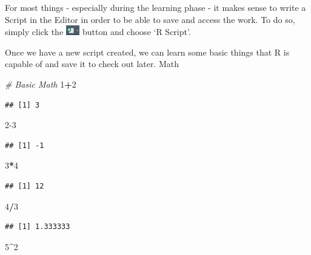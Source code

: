 \documentclass[
]{book}
\newenvironment{Shaded}{\begin{snugshade}}{\end{snugshade}}
\newcommand{\CommentTok}[1]{\textcolor[rgb]{0.56,0.35,0.01}{\textit{#1}}}
\newcommand{\DecValTok}[1]{\textcolor[rgb]{0.00,0.00,0.81}{#1}}
\newcommand{\SpecialCharTok}[1]{\textcolor[rgb]{0.81,0.36,0.00}{\textbf{#1}}}
\begin{document}
For most things - especially during the learning phase - it makes sense to write a Script in the Editor in order to be able to save and access the work.
To do so, simply click the \includegraphics[width=\textwidth,height=0.16667in]{./img/newfile.png} button and choose `R Script'.

Once we have a new script created, we can learn some basic things that R is capable of and save it to check out later.
Math

\begin{Shaded}
\begin{Highlighting}[]
\CommentTok{\# Basic Math}
\DecValTok{1}\SpecialCharTok{+}\DecValTok{2} 
\end{Highlighting}
\end{Shaded}

\begin{verbatim}
## [1] 3
\end{verbatim}

\begin{Shaded}
\begin{Highlighting}[]
\DecValTok{2{-}3}
\end{Highlighting}
\end{Shaded}

\begin{verbatim}
## [1] -1
\end{verbatim}

\begin{Shaded}
\begin{Highlighting}[]
\DecValTok{3}\SpecialCharTok{*}\DecValTok{4}
\end{Highlighting}
\end{Shaded}

\begin{verbatim}
## [1] 12
\end{verbatim}

\begin{Shaded}
\begin{Highlighting}[]
\DecValTok{4}\SpecialCharTok{/}\DecValTok{3}
\end{Highlighting}
\end{Shaded}

\begin{verbatim}
## [1] 1.333333
\end{verbatim}

\begin{Shaded}
\begin{Highlighting}[]
\DecValTok{5}\SpecialCharTok{\^{}}\DecValTok{2}
\end{Highlighting}
\end{Shaded}
\end{document}

